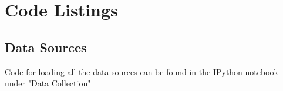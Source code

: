 \chapter{Code Listings}\label{ch:AppA}

\section{Data Sources}

Code for loading all the data sources can be found in the IPython notebook under "Data Collection" \cite{code_data_collection}

% 
% 
% 
